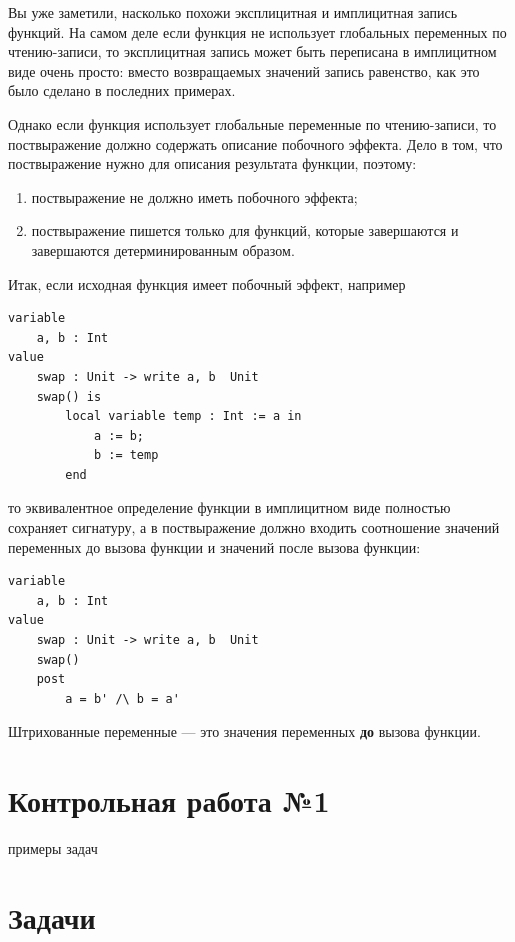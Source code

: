 \documentclass[14pt, twoside]{extreport}
\begin{document}
Вы уже заметили, насколько похожи эксплицитная и имплицитная запись функций. На самом деле если функция не использует глобальных переменных по чтению-записи, то эксплицитная запись может быть переписана в имплицитном виде очень просто: вместо возвращаемых значений запись равенство, как это было сделано в последних примерах.

Однако если функция использует глобальные переменные по чтению-записи, то поствыражение должно содержать описание побочного эффекта. Дело в том, что поствыражение нужно для описания результата функции, поэтому:
\begin{enumerate}
\item поствыражение не должно иметь побочного эффекта;
\item поствыражение пишется только для функций, которые завершаются и завершаются детерминированным образом.
\end{enumerate}
Итак, если исходная функция имеет побочный эффект, например
\begin{lstlisting}
variable
	a, b : Int
value
	swap : Unit -> write a, b  Unit
	swap() is
		local variable temp : Int := a in
			a := b;
			b := temp
		end
\end{lstlisting} 
то эквивалентное определение функции в имплицитном виде полностью сохраняет сигнатуру, а в поствыражение должно входить соотношение значений переменных до вызова функции и значений после вызова функции:
\begin{lstlisting}
variable
	a, b : Int
value
	swap : Unit -> write a, b  Unit
	swap()
	post
		a = b' /\ b = a'
\end{lstlisting}

Штрихованные переменные --- это значения переменных \textbf{до} вызова функции.

\section{Контрольная работа №1}

примеры задач



    \section*{Задачи}
\end{document}
